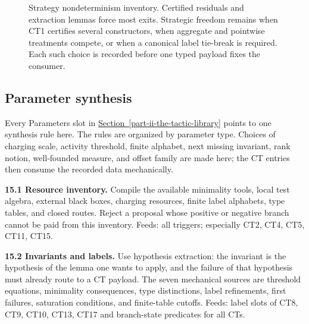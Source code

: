 \documentclass[
  11pt,
]{article}
\theoremstyle{definition}
\newcommand{\secref}[1]{\hyperref[#1]{Section~\ref*{#1}}}
\begin{document}
\begin{figure}[htbp]
{%
}
\caption[Strategy nondeterminism inventory]{Strategy nondeterminism inventory.  Certified residuals and extraction lemmas force most exits.  Strategic freedom remains when CT1 certifies several constructors, when aggregate and pointwise treatments compete, or when a canonical label tie-break is required.  Each such choice is recorded before one typed payload fixes the consumer.}
\label{fig:strategy-nondeterminism-inventory}
\end{figure}

\subsection{Parameter synthesis}\label{parameter-synthesis}

Every Parameters slot in \secref{part-ii-the-tactic-library} points to one synthesis rule here. The
rules are organized by parameter type.  Choices of charging scale,
activity threshold, finite alphabet, next missing invariant, rank notion,
well-founded measure, and offset family are made here; the CT entries
then consume the recorded data mechanically.

\textbf{15.1 Resource inventory.} Compile the available minimality
tools, local test algebra, external black boxes, charging resources,
finite label alphabets, type tables, and closed routes. Reject a
proposal whose positive or negative branch cannot be paid from this
inventory. Feeds: all triggers; especially CT2, CT4, CT5, CT11, CT15.

\textbf{15.2 Invariants and labels.} Use hypothesis extraction: the
invariant is the hypothesis of the lemma one wants to apply, and the
failure of that hypothesis must already route to a CT payload. The seven
mechanical sources are threshold equations, minimality consequences,
type distinctions, label refinements, first failures, saturation
conditions, and finite-table cutoffs. Feeds: label slots of CT8, CT9,
CT10, CT13, CT17 and branch-state predicates for all CTs.
\end{document}
